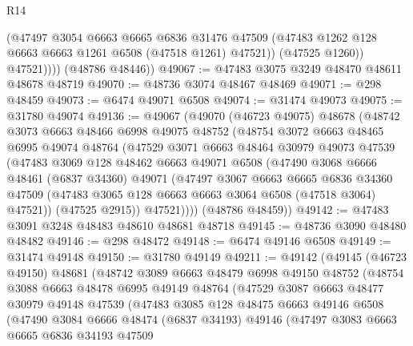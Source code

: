 \begin{lexlean}{R14}
\begin{coremodule}
                (@47497
                  @3054
                  @6663
                  @6665
                  @6836
                  @31476
                  @47509
                  (@47483 @1262 @128 @6663 @6663 @1261 @6508 (@47518 @1261) @47521))
                (@47525 @1260))
              @47521))))
      (@48786 @48446))
@49067 := @47483 @3075 @3249 @48470 @48611 @48678 @48719
@49070 := @48736 @3074 @48467 @48469
@49071 := @298 @48459
@49073 := @6474 @49071 @6508
@49074 := @31474 @49073
@49075 := @31780 @49074
@49136 := @49067
    (@49070
      (@46723 @49075)
      @48678
      (@48742
        @3073
        @6663
        @48466
        @6998
        @49075
        @48752
        (@48754
          @3072
          @6663
          @48465
          @6995
          @49074
          @48764
          (@47529
            @3071
            @6663
            @48464
            @30979
            @49073
            @47539
            (@47483
              @3069
              @128
              @48462
              @6663
              @49071
              @6508
              (@47490
                @3068
                @6666
                @48461
                (@6837 @34360)
                @49071
                (@47497
                  @3067
                  @6663
                  @6665
                  @6836
                  @34360
                  @47509
                  (@47483 @3065 @128 @6663 @6663 @3064 @6508 (@47518 @3064) @47521))
                (@47525 @2915))
              @47521))))
      (@48786 @48459))
@49142 := @47483 @3091 @3248 @48483 @48610 @48681 @48718
@49145 := @48736 @3090 @48480 @48482
@49146 := @298 @48472
@49148 := @6474 @49146 @6508
@49149 := @31474 @49148
@49150 := @31780 @49149
@49211 := @49142
    (@49145
      (@46723 @49150)
      @48681
      (@48742
        @3089
        @6663
        @48479
        @6998
        @49150
        @48752
        (@48754
          @3088
          @6663
          @48478
          @6995
          @49149
          @48764
          (@47529
            @3087
            @6663
            @48477
            @30979
            @49148
            @47539
            (@47483
              @3085
              @128
              @48475
              @6663
              @49146
              @6508
              (@47490
                @3084
                @6666
                @48474
                (@6837 @34193)
                @49146
                (@47497
                  @3083
                  @6663
                  @6665
                  @6836
                  @34193
                  @47509

\end{coremodule}
\end{lexlean}
